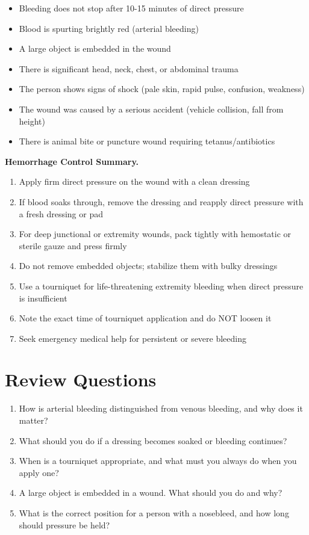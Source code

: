 \begin{itemize}[leftmargin=*]
  \item Bleeding does not stop after 10-15 minutes of direct pressure
  \item Blood is spurting brightly red (arterial bleeding)
  \item A large object is embedded in the wound
  \item There is significant head, neck, chest, or abdominal trauma
  \item The person shows signs of shock (pale skin, rapid pulse, confusion, weakness)
  \item The wound was caused by a serious accident (vehicle collision, fall from height)
  \item There is animal bite or puncture wound requiring tetanus/antibiotics
\end{itemize}

\medskip\noindent\textbf{Hemorrhage Control Summary.}
\begin{enumerate}
  \item Apply firm direct pressure on the wound with a clean dressing
  \item If blood soaks through, remove the dressing and reapply direct pressure with a fresh dressing or pad
  \item For deep junctional or extremity wounds, pack tightly with hemostatic or sterile gauze and press firmly
  \item Do not remove embedded objects; stabilize them with bulky dressings
  \item Use a tourniquet for life-threatening extremity bleeding when direct pressure is insufficient
  \item Note the exact time of tourniquet application and do NOT loosen it
  \item Seek emergency medical help for persistent or severe bleeding
\end{enumerate}

\section{Review Questions}

\begin{enumerate}[leftmargin=*]
\item How is arterial bleeding distinguished from venous bleeding, and why does it matter?
\item What should you do if a dressing becomes soaked or bleeding continues?
\item When is a tourniquet appropriate, and what must you always do when you apply one?
\item A large object is embedded in a wound. What should you do and why?
\item What is the correct position for a person with a nosebleed, and how long should pressure be held?
\end{enumerate}
